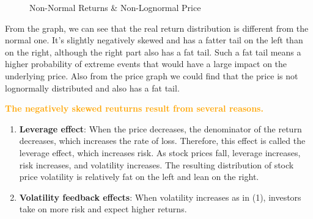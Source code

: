\documentclass[11pt,en]{elegantpaper}
\begin{document}
\begin{figure}[htbp]
    \centering
    \quad
    \caption{Non-Normal Returns \& Non-Lognormal Price}
\end{figure}

From the graph, we can see that the real return distribution is different from the normal one. It's slightly negatively skewed and has a fatter tail on the left than on the right, although the right part also has a fat tail. Such a fat tail means a higher probability of extreme events that would have a large impact on the underlying price. Also from the price graph we could find that the price is not lognormally distributed and also has a fat tail.

\textcolor{orange}{\textbf{The negatively skewed reuturns result from several reasons. }}
\begin{enumerate}
    \item \textbf{Leverage effect}: When the price decreases, the denominator of the return decreases, which increases the rate of loss. Therefore, this effect is called the leverage effect, which increases risk. As stock prices fall, leverage increases, risk increases, and volatility increases. The resulting distribution of stock price volatility is relatively fat on the left and lean on the right.
    \item \textbf{Volatility feedback effects}: When volatility increases as in (1), investors take on more risk and expect higher returns.
\end{enumerate}
\end{document}

